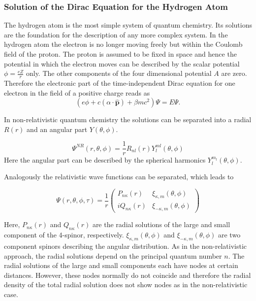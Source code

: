 \subsubsection{Solution of the Dirac Equation for the Hydrogen Atom}\label{hatom}
The hydrogen atom is the most simple system of quantum chemistry. Its solutions
are the foundation for the description of any more complex system.
In the hydrogen atom the electron is no longer moving freely but within the Coulomb
field of the proton. The proton is assumed to be fixed in space and hence the
potential in which the electron moves can be described by the scalar potential
$\phi=\frac{eZ}r$ only. The other components of the four dimensional potential $A$
are zero. Therefore the electronic part of the time-independent Dirac equation
for one electron in the field of a positive charge reads as
\begin{equation}
\left(e\phi + c(\alpha\cdot\hat{\mathbf{p}})+\beta mc^2\right) \Psi = E \Psi.
\end{equation}

In non-relativistic quantum chemistry the solutions can be separated into a radial
$R(r)$ and an angular part $Y(\theta,\phi)$.

\begin{equation}
\Psi^{NR}(r,\theta,\phi) = \frac1r R_{nl}(r)Y^{ml}_l(\theta,\phi)
\end{equation}
Here the angular part can be described by the spherical harmonics
$Y_l^{m_l}(\theta,\phi)$.

Analogously the relativistic wave functions can be separated, which leads to

\begin{equation}\label{seprel}
\Psi(r,\theta,\phi,\tau) = \frac1r \left( \begin{array}{rl}
P_{n\kappa}(r)  & \xi_{\kappa,m}(\theta,\phi)\\
iQ_{n\kappa}(r) & \xi_{-\kappa,m}(\theta,\phi)
\end{array}\right)
\end{equation}

Here, $P_{n\kappa}(r)$ and $Q_{n\kappa}(r)$ are the radial solutions of the
large and small component of the 4-spinor, respectively. $\xi_{\kappa,m}(\theta,\phi)$
and $\xi_{-\kappa,m}(\theta,\phi)$ are two component spinors describing the
angular distribution. As in the non-relativistic approach, the radial solutions
depend on the principal quantum number $n$. The radial solutions of the large and
small components each have nodes at certain distances. However, these nodes
normally do not coincide and therefore the radial density of the total radial
solution does not show nodes as in the non-relativistic case.

